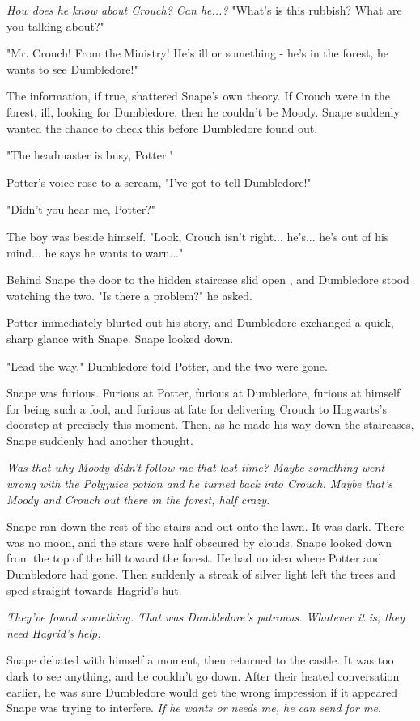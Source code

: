 \documentclass[a4paper,11pt]{article}
\begin{document}
\emph{How does he know about Crouch? Can he...?} "What's is this rubbish? What are you talking about?"

"Mr. Crouch! From the Ministry! He's ill or something - he's in the forest, he wants to see Dumbledore!"

The information, if true, shattered Snape's own theory. If Crouch were in the forest, ill, looking for Dumbledore, then he couldn't be Moody. Snape suddenly wanted the chance to check this before Dumbledore found out.

"The headmaster is busy, Potter."

Potter's voice rose to a scream, "I've got to tell Dumbledore!"

"Didn't you hear me, Potter?"

The boy was beside himself. "Look, Crouch isn't right... he's... he's out of his mind... he says he wants to warn..."

Behind Snape the door to the hidden staircase slid open , and Dumbledore stood watching the two. "Is there a problem?" he asked.

Potter immediately blurted out his story, and Dumbledore exchanged a quick, sharp glance with Snape. Snape looked down.

"Lead the way," Dumbledore told Potter, and the two were gone.

Snape was furious. Furious at Potter, furious at Dumbledore, furious at himself for being such a fool, and furious at fate for delivering Crouch to Hogwarts's doorstep at precisely this moment. Then, as he made his way down the staircases, Snape suddenly had another thought.

\emph{Was that why Moody didn't follow me that last time? Maybe something went wrong with the Polyjuice potion and he turned back into Crouch. Maybe that's Moody and Crouch out there in the forest, half crazy.}

Snape ran down the rest of the stairs and out onto the lawn. It was dark. There was no moon, and the stars were half obscured by clouds. Snape looked down from the top of the hill toward the forest. He had no idea where Potter and Dumbledore had gone. Then suddenly a streak of silver light left the trees and sped straight towards Hagrid's hut.

\emph{They've found something. That was Dumbledore's patronus. Whatever it is, they need Hagrid's help.}

Snape debated with himself a moment, then returned to the castle. It was too dark to see anything, and he couldn't go down. After their heated conversation earlier, he was sure Dumbledore would get the wrong impression if it appeared Snape was trying to interfere. \emph{If he wants or needs me, he can send for me.}
\end{document}
